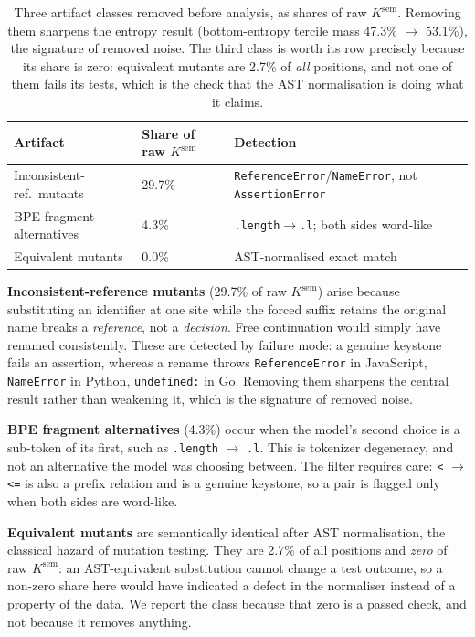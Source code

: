 \documentclass[twoside,11pt]{article}
\begin{document}
\begin{table}[h]
\centering\small
\begin{tabular}{lll}
\toprule
Artifact & Share of raw $K^{\mathrm{sem}}$ & Detection \\
\midrule
Inconsistent-ref.\ mutants & 29.7\% & \texttt{ReferenceError}/\texttt{NameError}, not \texttt{AssertionError} \\
BPE fragment alternatives & 4.3\% & \texttt{.length}$\rightarrow$\texttt{.l}; both sides word-like \\
Equivalent mutants & 0.0\% & AST-normalised exact match \\
\bottomrule
\end{tabular}
\caption{Three artifact classes removed before analysis, as shares of raw $K^{\mathrm{sem}}$.
Removing them sharpens the entropy result (bottom-entropy tercile mass 47.3\%
$\rightarrow$ 53.1\%), the signature of removed noise. The third class is worth its row precisely
because its share is zero: equivalent mutants are 2.7\% of \emph{all} positions, and not one of them
fails its tests, which is the check that the AST normalisation is doing what it claims.}
\label{tab:artifacts}
\end{table}

\textbf{Inconsistent-reference mutants} (29.7\% of raw $K^{\mathrm{sem}}$) arise because substituting an identifier at one
site while the forced suffix retains the original name breaks a \emph{reference}, not a
\emph{decision}. Free continuation would simply have renamed consistently. These are detected by
failure mode: a genuine keystone fails an assertion, whereas a rename throws \texttt{ReferenceError}
in JavaScript, \texttt{NameError} in Python, \texttt{undefined:} in Go. Removing them
sharpens the central result rather than weakening it, which is the signature of removed
noise.

\textbf{BPE fragment alternatives} (4.3\%) occur when the model's second choice is a sub-token of
its first, such as \texttt{.length} $\rightarrow$ \texttt{.l}. This is tokenizer degeneracy, and not an alternative the model was
choosing between. The filter requires care: \texttt{<} $\rightarrow$
\texttt{<=} is also a prefix relation and is a genuine keystone, so a pair is flagged only when both
sides are word-like.

\textbf{Equivalent mutants} are semantically identical after AST normalisation, the classical
hazard of mutation testing. They are 2.7\% of all positions and \emph{zero} of raw
$K^{\mathrm{sem}}$: an AST-equivalent substitution cannot change a test outcome, so a non-zero share
here would have indicated a defect in the normaliser instead of a property of the data. We report
the class because that zero is a passed check, and not because it removes anything.
\end{document}
